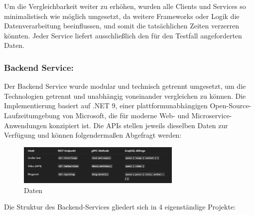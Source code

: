Um die Vergleichbarkeit weiter zu erhöhen, wurden alle Clients und Services so minimalistisch wie möglich umgesetzt, da weitere Frameworks oder Logik die Datenverarbeitung beeinflussen, und somit die tatsächlichen Zeiten verzerren könnten.
Jeder Service liefert ausschließlich den für den Testfall angeforderten Daten. 

\subsubsection{Backend Service:}

Der Backend Service wurde modular und technisch getrennt umgesetzt, um die Technologien getrennt und unabhängig voneinander vergleichen zu können. Die Implementierung basiert auf .NET 9, einer plattformunabhängigen Open-Source-Laufzeitumgebung von Microsoft, die für moderne Web- und Microservice-Anwendungen konzipiert ist.
Die APIs stellen jeweils dieselben Daten zur Verfügung und können folgendermaßen Abgefragt werden:

\begin{figure}[htbp]
	\centering
	\includegraphics[width=0.7\textwidth]{images/prakt1.png}
	\caption{Daten}
\end{figure}

Die Struktur des Backend-Services gliedert sich in 4 eigenständige Projekte:

